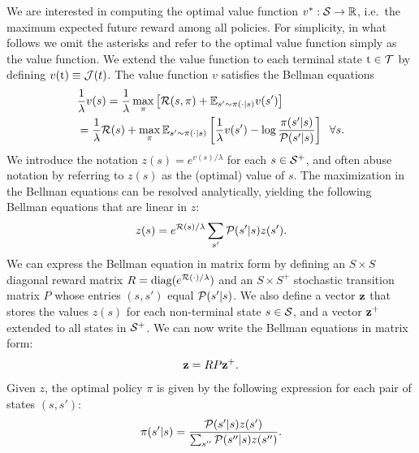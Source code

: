 We are interested in computing the optimal value function $v^*:\mathcal{S}\rightarrow\mathbb{R}$, i.e.~the maximum expected future reward among all policies. For simplicity, in what follows we omit the asterisks and refer to the optimal value function simply as the value function. We extend the value function to each terminal state $\text{t}\in\mathcal{T}$ by defining $v(\text{t})\equiv\mathcal{J}(t)$. The value function $v$ satisfies the Bellman equations
\begin{align*}
& \frac 1 \lambda v(s) = \frac 1 \lambda \max_\pi \left[ \mathcal{R}(s,\pi) + \mathbb{E}_{s'\sim\pi(\cdot|s)} v(s') \right] \\
 &= \frac{1}{\lambda} \mathcal{R}(s) + \max_\pi \mathbb{E}_{s'\sim\pi(\cdot|s)} \left[ \frac 1 \lambda v(s') - \log \frac {\pi(s'|s)} {\mathcal{P}(s'|s)} \right] \;\; \forall s.
\end{align*}
We introduce the notation $z(s)=e^{v(s)/\lambda}$ for each $s\in\mathcal{S}^+$, and often abuse notation by referring to $z(s)$ as the (optimal) value of $s$. The maximization in the Bellman equations can be resolved analytically, yielding the following Bellman equations that are linear in $z$:
\begin{equation}\label{eq:z}
z(s) = e^{\mathcal{R}(s)/\lambda} \sum_{s'}\mathcal{P}(s'|s)z(s').
\end{equation}
We can express the Bellman equation in matrix form by defining an $S\times S$ diagonal reward matrix $R=\text{diag}(e^{\mathcal{R}(\cdot)/\lambda})$ and an $S\times S^+$ stochastic transition matrix $P$ whose entries $(s,s')$ equal $\mathcal{P}(s'|s)$. We also define a vector $\bf z$ that stores the values $z(s)$ for each non-terminal state $s\in\mathcal{S}$, and a vector $\bf z^+$ extended to all states in $\mathcal{S}^+$. We can now write the Bellman equations in matrix form:
\begin{equation}\label{eq:matrixz}
{\bf z} = R P {\bf z^+}.
\end{equation}
Given $z$, the optimal policy $\pi$ is given by the following expression for each pair of states $(s,s')$:
\begin{equation}\label{eq:pi}
\pi(s'|s) = \frac {\mathcal{P}(s'|s)z(s')} {\sum_{s''} \mathcal{P}(s''|s)z(s'')}.
\end{equation}

